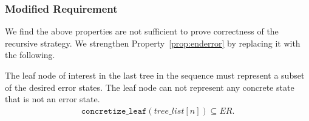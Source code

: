 \subsubsection{Modified Requirement}
We find the above properties are not sufficient to prove correctness of the
recursive strategy. We strengthen Property~\ref{prop:enderror} by replacing it with the following.

\setcounter{property}{1}
\renewcommand{\theproperty}{Z.\arabic{property}'} 
\begin{property}
  The leaf node of interest in the last tree in the
  sequence must represent a subset of the desired error states. The leaf node
  can not represent any concrete state that is not an error state.
  \label{prop:correctedz2}
  \begin{align*}
    \mathtt{concretize\_leaf}(\mathit{tree\_list}[n]) \subseteq \mathit{ER}.
  \end{align*}

 \end{property}
